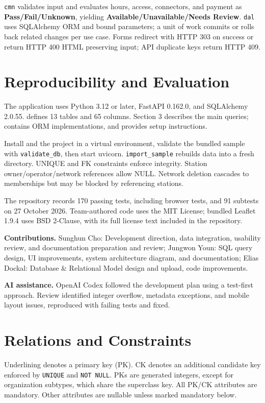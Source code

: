 \documentclass[sigconf,screen,nonacm]{acmart}
\begin{document}
\texttt{cmn} validates input and evaluates hours, access, connectors, and payment as \textbf{Pass/Fail/Unknown}, yielding \textbf{Available/Unavailable/Needs Review}. \texttt{dal} uses SQLAlchemy ORM and bound parameters; a unit of work commits or rolls back related changes per use case. Forms redirect with HTTP 303 on success or return HTTP 400 HTML preserving input; API duplicate keys return HTTP 409.

\section{Reproducibility and Evaluation}

The application uses Python 3.12 or later, FastAPI 0.162.0, and SQLAlchemy 2.0.55.  defines 13 tables and 65 columns. Section 3 describes the main queries;  contains ORM implementations, and  provides setup instructions.

Install  and the project in a virtual environment, validate the bundled sample with \texttt{validate\_db}, then start uvicorn. \texttt{import\_sample} rebuilds data into a fresh directory. UNIQUE and FK constraints enforce integrity. Station owner/operator/network references allow NULL. Network deletion cascades to memberships but may be blocked by referencing stations.

The repository records 170 passing tests, including browser tests, and 91 subtests on 27 October 2026. Team-authored code uses the MIT License; bundled Leaflet 1.9.4 uses BSD 2-Clause, with its full license text included in the repository.

\noindent\textbf{Contributions.} Sunghun Cho: Development direction, data integration, usability review, and documentation preparation and review; Jungwon Youn: SQL query design, UI improvements, system architecture diagram, and documentation; Elias Dockal: Database \& Relational Model design and upload, code improvements.

\noindent\textbf{AI assistance.} OpenAI Codex followed the development plan using a test-first approach. Review identified integer overflow, metadata exceptions, and mobile layout issues, reproduced with failing tests and fixed.


\onecolumn
\thispagestyle{empty}
\begingroup
\sloppy
\section*{Relations and Constraints}
\label{sec:relations-constraints}
Underlining denotes a primary key (PK). CK denotes an additional candidate key enforced by \texttt{UNIQUE} and \texttt{NOT NULL}. PKs are generated integers, except for organization subtypes, which share the superclass key. All PK/CK attributes are mandatory. Other attributes are nullable unless marked mandatory below.
\end{document}
